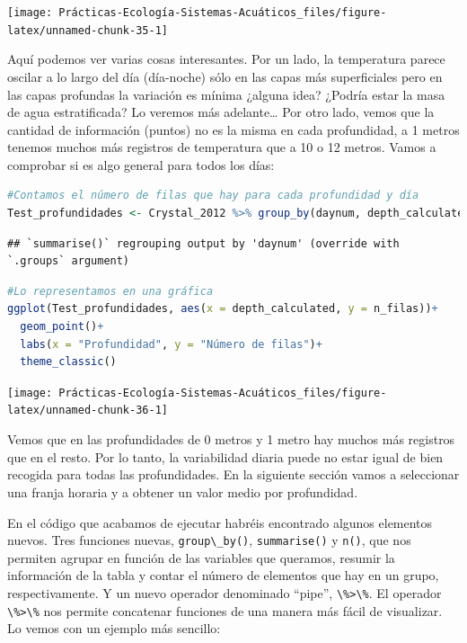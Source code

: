 \documentclass[
]{book}
\newcommand{\passthrough}[1]{#1}
\begin{document}
\texttt{[image: Prácticas-Ecología-Sistemas-Acuáticos\_files/figure-latex/unnamed-chunk-35-1]}

Aquí podemos ver varias cosas interesantes. Por un lado, la temperatura parece oscilar a lo largo del día (día-noche) sólo en las capas más superficiales pero en las capas profundas la variación es mínima ¿alguna idea? ¿Podría estar la masa de agua estratificada? Lo veremos más adelante\ldots{} Por otro lado, vemos que la cantidad de información (puntos) no es la misma en cada profundidad, a 1 metros tenemos muchos más registros de temperatura que a 10 o 12 metros. Vamos a comprobar si es algo general para todos los días:

\begin{lstlisting}[language=R]
#Contamos el número de filas que hay para cada profundidad y día
Test_profundidades <- Crystal_2012 %>% group_by(daynum, depth_calculated) %>% summarise(n_filas = n())
\end{lstlisting}

\begin{lstlisting}
## `summarise()` regrouping output by 'daynum' (override with `.groups` argument)
\end{lstlisting}

\begin{lstlisting}[language=R]
#Lo representamos en una gráfica
ggplot(Test_profundidades, aes(x = depth_calculated, y = n_filas))+
  geom_point()+
  labs(x = "Profundidad", y = "Número de filas")+
  theme_classic()
\end{lstlisting}

\texttt{[image: Prácticas-Ecología-Sistemas-Acuáticos\_files/figure-latex/unnamed-chunk-36-1]}

Vemos que en las profundidades de 0 metros y 1 metro hay muchos más registros que en el resto. Por lo tanto, la variabilidad diaria puede no estar igual de bien recogida para todas las profundidades. En la siguiente sección vamos a seleccionar una franja horaria y a obtener un valor medio por profundidad.

En el código que acabamos de ejecutar habréis encontrado algunos elementos nuevos. Tres funciones nuevas, \passthrough{\lstinline!group\_by()!}, \passthrough{\lstinline!summarise()!} y \passthrough{\lstinline!n()!}, que nos permiten agrupar en función de las variables que queramos, resumir la información de la tabla y contar el número de elementos que hay en un grupo, respectivamente. Y un nuevo operador denominado ``pipe'', \passthrough{\lstinline!\%>\%!}. El operador \passthrough{\lstinline!\%>\%!} nos permite concatenar funciones de una manera más fácil de visualizar. Lo vemos con un ejemplo más sencillo:
\end{document}
